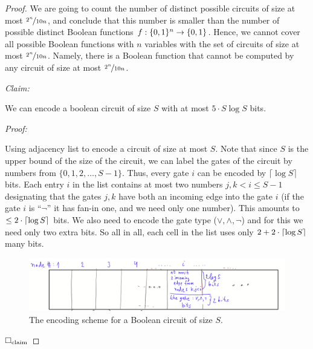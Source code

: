 \begin{proof}
We are going to count the number of distinct possible circuits of size at most $\nicefrac{2^n}{10 n}$, and conclude that this number is smaller than the number of possible distinct Boolean functions $f:\{0,1\}^n\to\{0,1\}$. Hence, we cannot cover all possible Boolean functions with $n$ variables with the set of circuits of size at most $\nicefrac{2^n}{10 n}$. Namely, there is a Boolean function that cannot be computed by any circuit of size at most $\nicefrac{2^n}{10 n}$.

 

\renewenvironment{claim}{%
    \vspace{6pt} 
    \noindent\textit{Claim:} %
    \itshape %
}{%
    \par %
}

\newenvironment{proofclaim}{%
    \vspace{6pt} 
    \noindent\textit{Proof:} %
}{%
    \hfill$\Box_{\rm claim}$\par\vspace{10pt} %
}



\begin{claim}
We can encode a boolean circuit of size $S$ with at most $5\cdot S \log S$ bits.
\end{claim}

\begin{proofclaim}
Using adjacency list to encode a circuit of size at most $S$.   Note that since $S$ is the upper bound of the size of the circuit, we can label the gates of the circuit by numbers from $\{0,1,2,\dots,S-1\}$. Thus, every gate $i$ can be encoded by $\lceil \log S \rceil$ bits.  Each entry $i$ in the list contains at most two numbers $j,k<i\le S-1$ designating that the gates $j,k$ have both an incoming edge into the gate $i$ (if the gate $i$ is ``$\neg$'' it has fan-in one, and we need only one number). This amounts to $\le 2\cdot \lceil\log S\rceil$ bits. We also need to encode the gate type ($\lor,\land,\neg$) and for this we need only two extra bits. So all in all, each cell in the list uses only $2+2\cdot\lceil\log S\rceil$ many bits.
\begin{figure}[H]
    \centering
    \includegraphics[width=1.1\linewidth]{images/shannon_table.png}
    \caption{The encoding scheme for a Boolean circuit of size $S$.}
    \label{fig:enter-label}
\end{figure}



\end{proofclaim}
\end{proof}
